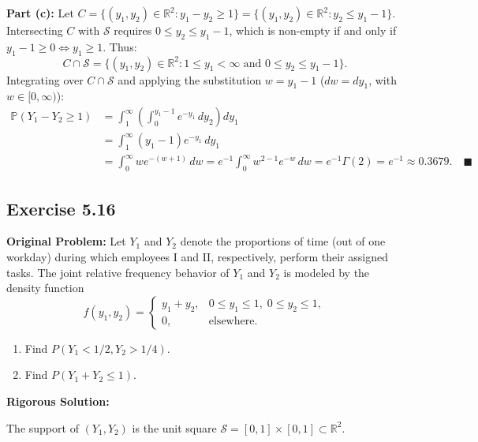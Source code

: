 \documentclass[11pt, letterpaper]{article}
\theoremstyle{definition}
\theoremstyle{remark}
\newcommand{\Prob}{\mathbb{P}}
\begin{document}
\textbf{Part (c):} Let $C = \{(y_1, y_2) \in \mathbb{R}^2 : y_1 - y_2 \ge 1\} = \{(y_1, y_2) \in \mathbb{R}^2 : y_2 \le y_1 - 1\}$. Intersecting $C$ with $\mathcal{S}$ requires $0 \le y_2 \le y_1 - 1$, which is non-empty if and only if $y_1 - 1 \ge 0 \iff y_1 \ge 1$. Thus:
\[ C \cap \mathcal{S} = \{(y_1, y_2) \in \mathbb{R}^2 : 1 \le y_1 < \infty \text{ and } 0 \le y_2 \le y_1 - 1\}. \]
Integrating over $C \cap \mathcal{S}$ and applying the substitution $w = y_1 - 1$ ($dw = dy_1$, with $w \in [0, \infty)$):
\begin{align*}
    \Prob(Y_1 - Y_2 \ge 1) &= \int_1^\infty \left( \int_0^{y_1 - 1} e^{-y_1} \, dy_2 \right) dy_1 \\
    &= \int_1^\infty (y_1 - 1) e^{-y_1} \, dy_1 \\
    &= \int_0^\infty w e^{-(w + 1)} \, dw = e^{-1} \int_0^\infty w^{2-1} e^{-w} \, dw = e^{-1} \Gamma(2) = e^{-1} \approx 0.3679. \quad \blacksquare
\end{align*}

\subsection{Exercise 5.16}

\textbf{Original Problem:}
Let $Y_1$ and $Y_2$ denote the proportions of time (out of one workday) during which employees I and II, respectively, perform their assigned tasks. The joint relative frequency behavior of $Y_1$ and $Y_2$ is modeled by the density function
\[ f(y_1, y_2) = \begin{cases} y_1 + y_2, & 0 \le y_1 \le 1, \; 0 \le y_2 \le 1, \\ 0, & \text{elsewhere.} \end{cases} \]
\begin{enumerate}[label=\textbf{\alph*}]
    \item Find $P(Y_1 < 1/2, Y_2 > 1/4)$.
    \item Find $P(Y_1 + Y_2 \le 1)$.
\end{enumerate}

\textbf{Rigorous Solution:}

The support of $(Y_1, Y_2)$ is the unit square $\mathcal{S} = [0, 1] \times [0, 1] \subset \mathbb{R}^2$.
\end{document}

